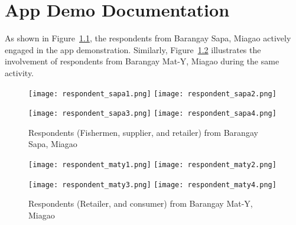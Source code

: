%
%
%                 
\chapter{App Demo Documentation}
\label{sec:appendixd}
\vspace*{-1cm}
As shown in Figure~\ref{fig:sapa}, the respondents from Barangay Sapa, Miagao actively engaged in the app demonstration. Similarly, Figure~\ref{fig:mat-y} illustrates the involvement of respondents from Barangay Mat-Y, Miagao during the same activity.


\begin{figure}[h!]
  \centering
  \texttt{[image: respondent\_sapa1.png]}
  \hfill
  \texttt{[image: respondent\_sapa2.png]}
  \par\bigskip
  \texttt{[image: respondent\_sapa3.png]}
  \hfill
  \texttt{[image: respondent\_sapa4.png]}
  \caption{Respondents (Fishermen, supplier, and retailer) from Barangay Sapa, Miagao}
  \label{fig:sapa}
\end{figure}

\begin{figure}[h!]
  \centering
  \texttt{[image: respondent\_maty1.png]}
  \hfill
  \texttt{[image: respondent\_maty2.png]}
  \par\bigskip
  \texttt{[image: respondent\_maty3.png]}
  \hfill
  \texttt{[image: respondent\_maty4.png]}
  \caption{Respondents (Retailer, and consumer) from Barangay Mat-Y, Miagao}
  \label{fig:mat-y}
\end{figure}
